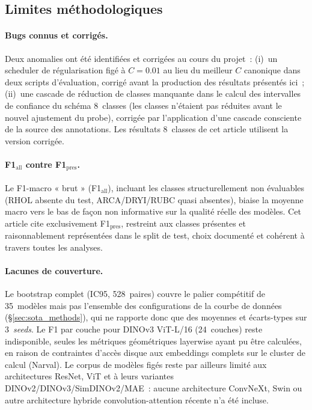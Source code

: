 \documentclass[11pt,a4paper]{article}
\newcommand{\fmpres}{F1$_{\text{pres}}$}
\newcommand{\fmall}{F1$_{\text{all}}$}
\begin{document}
\subsection{Limites méthodologiques}
\label{sec:limits}

\paragraph{Bugs connus et corrigés.} Deux anomalies ont été identifiées et corrigées au cours du projet~: (i)~un scheduler de régularisation figé à $C=0.01$ au lieu du meilleur $C$ canonique dans deux scripts d'évaluation, corrigé avant la production des résultats présentés ici~; (ii)~une cascade de réduction de classes manquante dans le calcul des intervalles de confiance du schéma 8~classes (les classes n'étaient pas réduites avant le nouvel ajustement du probe), corrigée par l'application d'une cascade consciente de la source des annotations. Les résultats 8~classes de cet article utilisent la version corrigée.

\paragraph{\fmall{} contre \fmpres{}.} Le F1-macro « brut » (\fmall{}), incluant les classes structurellement non évaluables (RHOL absente du test, ARCA/DRYI/RUBC quasi absentes), biaise la moyenne macro vers le bas de façon non informative sur la qualité réelle des modèles. Cet article cite exclusivement \fmpres{}, restreint aux classes présentes et raisonnablement représentées dans le split de test, choix documenté et cohérent à travers toutes les analyses.

\paragraph{Lacunes de couverture.} Le bootstrap complet (IC95, 528~paires) couvre le palier compétitif de 35~modèles mais pas l'ensemble des configurations de la courbe de données (\S\ref{sec:sota_methods}), qui ne rapporte donc que des moyennes et écarts-types sur 3~\emph{seeds}. Le F1 par couche pour DINOv3 ViT-L/16 (24~couches) reste indisponible, seules les métriques géométriques layerwise ayant pu être calculées, en raison de contraintes d'accès disque aux embeddings complets sur le cluster de calcul (Narval). Le corpus de modèles figés reste par ailleurs limité aux architectures ResNet, ViT et à leurs variantes DINOv2/DINOv3/SimDINOv2/MAE~: aucune architecture ConvNeXt, Swin ou autre architecture hybride convolution-attention récente n'a été incluse.
\end{document}
